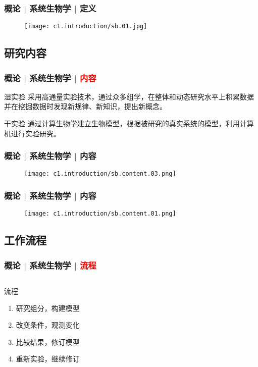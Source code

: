 \begin{frame}
  \frametitle{概论 | 系统生物学 | 定义}
  \begin{figure}
    \centering
    \texttt{[image: c1.introduction/sb.01.jpg]}
  \end{figure}
\end{frame}

\subsection{研究内容}
\begin{frame}
  \frametitle{概论 | 系统生物学 | \textcolor{red}{内容}}
  \begin{block}{湿实验}
采用高通量实验技术，通过众多组学，在整体和动态研究水平上积累数据并在挖掘数据时发现新规律、新知识，提出新概念。
  \end{block}
  \pause
  \begin{block}{干实验}
通过计算生物学建立生物模型，根据被研究的真实系统的模型，利用计算机进行实验研究。
  \end{block}
\end{frame}

\begin{frame}
  \frametitle{概论 | 系统生物学 | 内容}
  \begin{figure}
    \centering
    \texttt{[image: c1.introduction/sb.content.03.png]}
  \end{figure}
\end{frame}

\begin{frame}
  \frametitle{概论 | 系统生物学 | 内容}
  \begin{figure}
    \centering
    \texttt{[image: c1.introduction/sb.content.01.png]}
  \end{figure}
\end{frame}

\subsection{工作流程}
\begin{frame}
  \frametitle{概论 | 系统生物学 | \textcolor{red}{流程}}
  \begin{columns}
    \begin{block}{流程}
  \begin{enumerate}
    \item 研究组分，构建模型
    \item 改变条件，观测变化
    \item 比较结果，修订模型
    \item 重新实验，继续修订
  \end{enumerate}
    \end{block}
  \begin{figure}
    \centering
  \end{figure}
  \end{columns}
\end{frame}

